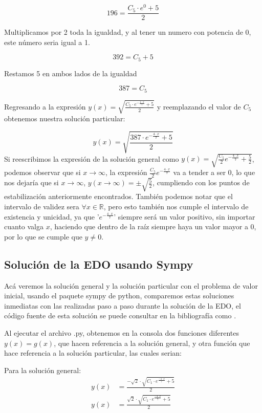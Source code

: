 \documentclass{article}
\begin{document}
\[
 196=\frac{C_5\cdot e^{0}+5}{2}
\] 

Multiplicamos por 2 toda la igualdad, y al tener un numero con potencia de 0, este número seria igual a 1.

\[
 392=C_5+5
\] 

Restamos 5 en ambos lados de la igualdad

\[
 387=C_5
\]

Regresando a la expresión \(y(x) = \sqrt{\frac{C_5\cdot e^{-\frac{4\cdot x}{7}}+5}{2}}\) y reemplazando el valor de \(C_5\) obtenemos nuestra solución particular:

\[
 y(x) = \sqrt{\frac{387\cdot e^{-\frac{4\cdot x}{7}}+5}{2}}
\]
Si reescribimos la expresión de la solución general como \(y(x)=\sqrt{\frac{C_5}{2}e^{-\frac{4\cdot x}{7}}+\frac{5}{2}}\), podemos observar que si \(x \to \infty\), la expresión \(\frac{C_5}{2}e^{-\frac{4\cdot x}{7}}\) va a tender a ser 0, lo que nos dejaría que si \(x \to \infty\), \(y(x\to \infty)=\pm\sqrt{\frac{5}{2}}\), cumpliendo con los puntos de estabilización anteriormente encontrados. También podemos notar que el intervalo de validez sera \(\forall x \in \mathbb{R}\), pero esto también nos cumple el intervalo de existencia y unicidad, ya que '\( e^{-\frac{4\cdot x}{7}}\)' siempre será un valor positivo, sin importar cuanto valga \(x\), haciendo que dentro de la raíz siempre haya un valor mayor a 0, por lo que se cumple que \(y\neq0\). 

\subsection{Solución de la EDO usando Sympy}

Acá veremos la solución general y la solución particular con el problema de valor inicial, usando el paquete sympy de python, comparemos estas soluciones inmediatas con las realizadas paso a paso durante la solución de la EDO, el código fuente de esta solución se puede consultar en la bibliografía como \cite{codigo_mapaPendiente}.

Al ejecutar el archivo .py, obtenemos en la consola dos funciones diferentes \(y(x)=g(x)\), que hacen referencia a la solución general, y otra función que hace referencia a la solución particular, las cuales serian:

Para la solución general:
\begin{align*}
y(x)&=\frac{-\sqrt{2}\cdot\sqrt{C_1\cdot e^{\frac{-4\cdot x}{7}}+5}}{2} \\
y(x)&=\frac{\sqrt{2}\cdot\sqrt{C_1\cdot e^{\frac{-4\cdot x}{7}}+5}}{2} 
\end{align*}
\end{document}
